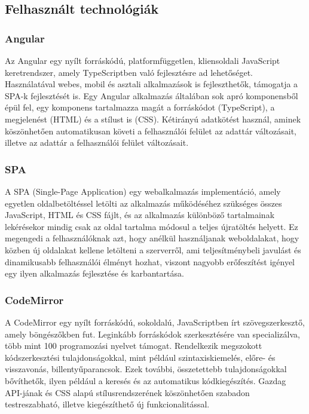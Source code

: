 \documentclass{elteikthesis}
\begin{document}
			\subsection{Felhasznált technológiák}
				\subsubsection{Angular}
					Az Angular \cite{angular} egy nyílt forráskódú, platformfüggetlen, kliensoldali JavaScript keretrendszer, amely TypeScriptben való fejlesztésre ad lehetőséget. Használatával webes, mobil és asztali alkalmazások is fejleszthetők, támogatja a SPA-k fejlesztését is. Egy Angular alkalmazás általában sok apró komponensből épül fel, egy komponens tartalmazza magát a forráskódot (TypeScript), a megjelenést (HTML) és a stílust is (CSS). Kétirányú adatkötést használ, aminek köszönhetően automatikusan követi a felhasználói felület az adattár változásait, illetve az adattár a felhasználói felület változásait.
			
				\subsubsection{SPA}
					A SPA (Single-Page Application) \cite{spa} egy webalkalmazás implementáció, amely egyetlen oldalbetöltéssel letölti az alkalmazás működéséhez szükséges összes JavaScript, HTML és CSS fájlt, és az alkalmazás különböző tartalmainak lekérésekor mindig csak az oldal tartalma módosul a teljes újratöltés helyett. Ez megengedi a felhasználóknak azt, hogy anélkül használjanak weboldalakat, hogy közben új oldalakat kellene letölteni a szerverről, ami teljesítménybeli javulást és dinamikusabb felhasználói élményt hozhat, viszont nagyobb erőfeszítést igényel egy ilyen alkalmazás fejlesztése és karbantartása.
			
				\subsubsection{CodeMirror}
					A CodeMirror \cite{codemirror} egy nyílt forráskódú, sokoldalú, JavaScriptben írt szövegszerkesztő, amely böngészőkben fut. Leginkább forráskódok szerkesztésére van specializálva, több mint 100 programozási nyelvet támogat. Rendelkezik megszokott kódszerkesztési tulajdonságokkal, mint például szintaxiskiemelés, előre- és visszavonás, billentyűparancsok. Ezek további, összetettebb tulajdonságokkal bővíthetők, ilyen például a keresés és az automatikus kódkiegészítés. Gazdag API-jának és CSS alapú stílusrendszerének köszönhetően szabadon testreszabható, illetve kiegészíthető új funkcionalitással.
\end{document}

